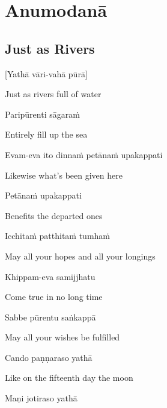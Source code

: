 \chapter{Anumodanā}

\section{Just as Rivers}


[Yathā vāri-vahā pūrā]

\begin{cprenglish}
  Just as rivers full of water
\end{cprenglish}

Paripūrenti sāgaraṁ

\begin{cprenglish}
  Entirely fill up the sea
\end{cprenglish}

Evam-eva ito dinnaṁ petānaṁ upakappati

\begin{cprenglish}
Likewise what’s been given here
\end{cprenglish}

Petānaṁ upakappati

\begin{cprenglish}
Benefits the departed ones
\end{cprenglish}

Icchitaṁ patthitaṁ tumhaṁ

\begin{cprenglish}
  May all your hopes and all your longings
\end{cprenglish}

Khippam-eva samijjhatu

\begin{cprenglish}
  Come true in no long time
\end{cprenglish}

Sabbe pūrentu saṅkappā

\begin{cprenglish}
  May all your wishes be fulfilled
\end{cprenglish}

Cando paṇṇaraso yathā

\begin{cprenglish}
  Like on the fifteenth day the moon
\end{cprenglish}

Maṇi jotiraso yathā

